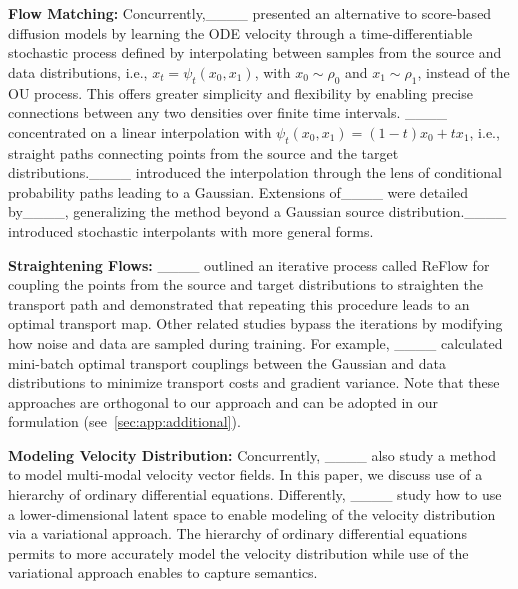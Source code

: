 \textbf{Flow Matching:}
Concurrently,____ presented an alternative to score-based diffusion models by learning the ODE velocity through a time-differentiable stochastic process defined by interpolating between samples from the source and data distributions, i.e., $x_t = \psi_{t} (x_0, x_1)$, 
with $x_0 \sim \rho_0$ and $x_1 \sim \rho_1$, 
instead of the OU process. This offers greater simplicity and flexibility by enabling precise connections between any two densities over finite time intervals. ____ concentrated on a linear interpolation with $\psi_{t} (x_0, x_1) = (1-t) x_0 + t x_1$, i.e., straight paths connecting points from the source and the target distributions.____ introduced the interpolation through the lens of conditional probability paths leading to a Gaussian. Extensions of____ were detailed by____, generalizing the method beyond a Gaussian source distribution.____ introduced stochastic interpolants with more general forms. 

\textbf{Straightening Flows:}  
____ outlined an iterative process called ReFlow for coupling the points from the source and target distributions to straighten the transport path and demonstrated that repeating this procedure leads to an optimal transport map. Other related studies bypass the iterations by modifying how noise and data are sampled during training. For example, ____ calculated mini-batch optimal transport couplings between the Gaussian and data distributions to minimize transport costs and gradient variance. %
Note that these approaches are orthogonal to our approach and can be adopted in our formulation (see~\cref{sec:app:additional}). %

\textbf{Modeling Velocity Distribution:} Concurrently, ____ also study a method to model multi-modal velocity vector fields. In this paper, we discuss  use of a hierarchy of ordinary differential equations. Differently, ____ study how to use a lower-dimensional latent space to enable modeling of the velocity distribution via a variational approach. The hierarchy of ordinary differential equations permits to more accurately model the velocity distribution while use of the variational approach enables to capture semantics.
\vspace{-5pt}